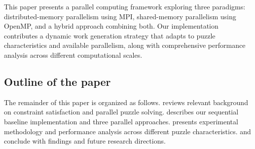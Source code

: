 This paper presents a parallel computing framework exploring three paradigms: distributed-memory parallelism using MPI, shared-memory parallelism using OpenMP, and a hybrid approach combining both. Our implementation contributes a dynamic work generation strategy that adapts to puzzle characteristics and available parallelism, along with comprehensive performance analysis across different computational scales.

\subsection{Outline of the paper}
The remainder of this paper is organized as follows.  reviews relevant background on constraint satisfaction and parallel puzzle solving.  describes our sequential baseline implementation and three parallel approaches.  presents experimental methodology and performance analysis across different puzzle characteristics.  and  conclude with findings and future research directions.